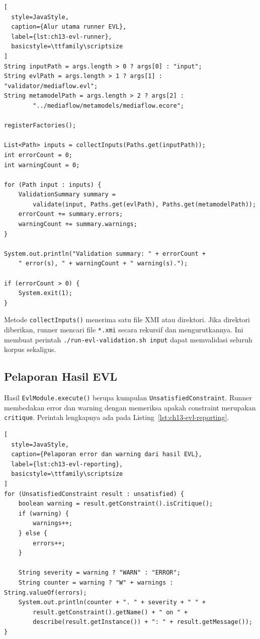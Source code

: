 \begin{lstlisting}[
  style=JavaStyle,
  caption={Alur utama runner EVL},
  label={lst:ch13-evl-runner},
  basicstyle=\ttfamily\scriptsize
]
String inputPath = args.length > 0 ? args[0] : "input";
String evlPath = args.length > 1 ? args[1] : "validator/mediaflow.evl";
String metamodelPath = args.length > 2 ? args[2] :
        "../mediaflow/metamodels/mediaflow.ecore";

registerFactories();

List<Path> inputs = collectInputs(Paths.get(inputPath));
int errorCount = 0;
int warningCount = 0;

for (Path input : inputs) {
    ValidationSummary summary =
        validate(input, Paths.get(evlPath), Paths.get(metamodelPath));
    errorCount += summary.errors;
    warningCount += summary.warnings;
}

System.out.println("Validation summary: " + errorCount +
    " error(s), " + warningCount + " warning(s).");

if (errorCount > 0) {
    System.exit(1);
}
\end{lstlisting}

Metode \texttt{collectInputs()} menerima satu file XMI atau direktori. Jika direktori diberikan, runner mencari file \texttt{*.xmi} secara rekursif dan mengurutkannya. Ini membuat perintah \texttt{./run-evl-validation.sh input} dapat memvalidasi seluruh korpus sekaligus.

\subsection{Pelaporan Hasil EVL}

Hasil \texttt{EvlModule.execute()} berupa kumpulan \texttt{UnsatisfiedConstraint}. Runner membedakan error dan warning dengan memeriksa apakah constraint merupakan \texttt{critique}. Perintah lengkapnya ada pada Listing~\ref{lst:ch13-evl-reporting}.

\begin{lstlisting}[
  style=JavaStyle,
  caption={Pelaporan error dan warning dari hasil EVL},
  label={lst:ch13-evl-reporting},
  basicstyle=\ttfamily\scriptsize
]
for (UnsatisfiedConstraint result : unsatisfied) {
    boolean warning = result.getConstraint().isCritique();
    if (warning) {
        warnings++;
    } else {
        errors++;
    }

    String severity = warning ? "WARN" : "ERROR";
    String counter = warning ? "W" + warnings : String.valueOf(errors);
    System.out.println(counter + ". " + severity + " " +
        result.getConstraint().getName() + " on " +
        describe(result.getInstance()) + ": " + result.getMessage());
}
\end{lstlisting}

